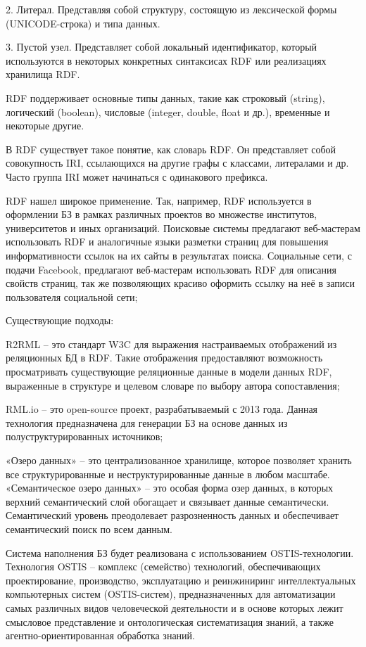 2. Литерал. Представляя собой структуру, состоящую из лексической формы (UNICODE-строка) и типа данных.

3. Пустой узел. Представляет собой локальный идентификатор, который используются в некоторых конкретных синтаксисах RDF или реализациях хранилища RDF.

RDF поддерживает основные типы данных, такие как строковый (string), логический (boolean), числовые (integer, double, float и др.), временные и некоторые другие.

В RDF существует такое понятие, как словарь RDF. Он представляет собой совокупность IRI, ссылающихся на другие графы с классами, литералами и др. Часто группа IRI может начинаться с одинакового префикса.

RDF нашел широкое применение. Так, например, RDF используется в оформлении БЗ в рамках различных проектов во множестве институтов, университетов и иных организаций. Поисковые системы предлагают веб-мастерам использовать RDF и аналогичные языки разметки страниц для повышения информативности ссылок на их сайты в результатах поиска. Социальные сети, с подачи Facebook, предлагают веб-мастерам использовать RDF для описания свойств страниц, так же позволяющих красиво оформить ссылку на неё в записи пользователя социальной сети;

Существующие подходы:
\begin{textitemize}
    \item R2RML – это стандарт W3C для выражения настраиваемых отображений из реляционных БД в RDF. Такие отображения предоставляют возможность просматривать существующие реляционные данные в модели данных RDF, выраженные в структуре и целевом словаре по выбору автора сопоставления;
    \item RML.io – это open-source проект, разрабатываемый с 2013 года. Данная технология предназначена для генерации БЗ на основе данных из полуструктурированных источников;
    \item «Озеро данных» – это централизованное хранилище, которое позволяет хранить все структурированные и неструктурированные данные в любом масштабе. «Семантическое озеро данных» – это особая форма озер данных, в которых верхний семантический слой обогащает и связывает данные семантически. Семантический уровень преодолевает разрозненность данных и обеспечивает семантический поиск по всем данным.
\end{textitemize}

Система наполнения БЗ будет реализована с использованием OSTIS-технологии. Технология OSTIS – комплекс (семейство) технологий, обеспечивающих проектирование, производство, эксплуатацию и реинжиниринг интеллектуальных компьютерных систем (OSTIS-систем), предназначенных для автоматизации самых различных видов человеческой деятельности и в основе которых лежит смысловое представление и онтологическая систематизация знаний, а также агентно-ориентированная обработка знаний.


